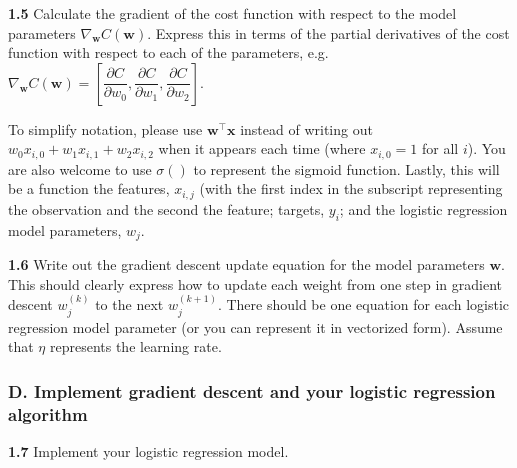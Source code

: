\documentclass[
  letterpaper,
  DIV=11,
  numbers=noendperiod]{scrartcl}
\begin{document}
\textbf{1.5} Calculate the gradient of the cost function with respect to
the model parameters \(\nabla_{\mathbf{w}}C(\mathbf{w})\). Express this
in terms of the partial derivatives of the cost function with respect to
each of the parameters,
e.g.~\(\nabla_{\mathbf{w}}C(\mathbf{w}) = \left[\dfrac{\partial C}{\partial w_0}, \dfrac{\partial C}{\partial w_1}, \dfrac{\partial C}{\partial w_2}\right]\).

To simplify notation, please use \(\mathbf{w}^{\top}\mathbf{x}\) instead
of writing out \(w_0 x_{i,0} + w_1 x_{i,1} + w_2 x_{i,2}\) when it
appears each time (where \(x_{i,0} = 1\) for all \(i\)). You are also
welcome to use \(\sigma()\) to represent the sigmoid function. Lastly,
this will be a function the features, \(x_{i,j}\) (with the first index
in the subscript representing the observation and the second the
feature; targets, \(y_i\); and the logistic regression model parameters,
\(w_j\).

\textbf{1.6} Write out the gradient descent update equation for the
model parameters \(\mathbf{w}\). This should clearly express how to
update each weight from one step in gradient descent \(w_j^{(k)}\) to
the next \(w_j^{(k+1)}\). There should be one equation for each logistic
regression model parameter (or you can represent it in vectorized form).
Assume that \(\eta\) represents the learning rate.

\subsubsection{D. Implement gradient descent and your logistic
regression
algorithm}\label{d.-implement-gradient-descent-and-your-logistic-regression-algorithm}

\textbf{1.7} Implement your logistic regression model.
\end{document}
